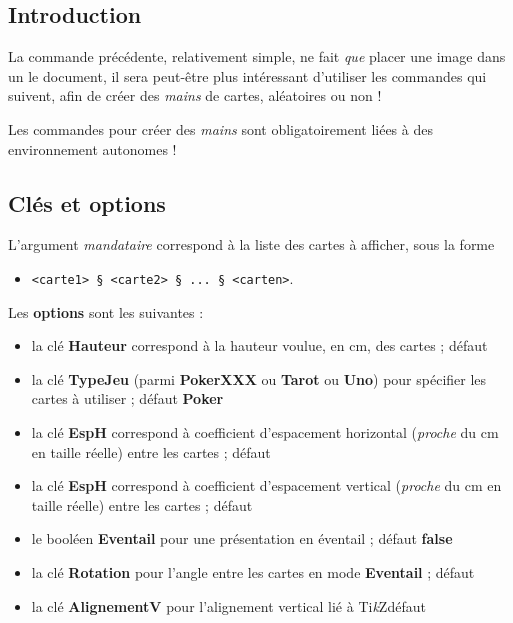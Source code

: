 \documentclass{article}
\providecommand\tikzlogo{Ti\textit{k}Z}
\let\TikZ\tikzlogo
\newcommand\ctex[1]{\tcbox[vignettelatex]{#1}}
\newcommand\Cle[1]{{\bfseries\sffamily\textlangle #1\textrangle}}
\begin{document}
{{{{{{{\subsection{Introduction}

\begin{codeidee}
La commande précédente, relativement simple, ne fait \textit{que} placer une image dans un le document, il sera peut-être plus intéressant d'utiliser les commandes qui suivent, afin de créer des \textit{mains} de cartes, aléatoires ou non !
\end{codeidee}

\begin{codeattention}
Les commandes pour créer des \textit{mains} sont obligatoirement liées à des environnement \ctex{tikzpicture} autonomes !
\end{codeattention}

\begin{codetex}
\end{codetex}

\subsection{Clés et options}

\begin{codecles}
L'argument \textit{mandataire} correspond à la liste des cartes à afficher, sous la forme 

\begin{itemize}
	\item \texttt{<carte1> § <carte2> § ... § <carten>}.
\end{itemize}

Les \Cle{options} sont les suivantes :

\begin{itemize}
	\item la clé \Cle{Hauteur} correspond à la hauteur voulue, en cm, des cartes ; \hfill{}défaut \Cle{4.25}
	\item la clé \Cle{TypeJeu} (parmi \Cle{PokerXXX} ou \Cle{Tarot} ou \Cle{Uno}) pour spécifier les cartes à utiliser ; \hfill{}défaut \Cle{Poker}
	\item la clé \Cle{EspH} correspond à coefficient d'espacement horizontal (\textit{proche} du cm en taille réelle) entre les cartes ; \hfill{}défaut \Cle{1}
	\item la clé \Cle{EspH} correspond à coefficient d'espacement vertical (\textit{proche} du cm en taille réelle) entre les cartes ; \hfill{}défaut \Cle{0}
	\item le booléen \Cle{Eventail} pour une présentation en éventail ; \hfill{}défaut \Cle{false}
	\item la clé \Cle{Rotation} pour l'angle entre les cartes en mode \Cle{Eventail}  ; \hfill{}défaut \Cle{10}
	\item la clé \Cle{AlignementV} pour l'alignement vertical lié à \TikZ{}\hfill{}défaut \Cle{0.5}
\end{itemize}
\end{codecles}

}}}}}}}
\end{document}
